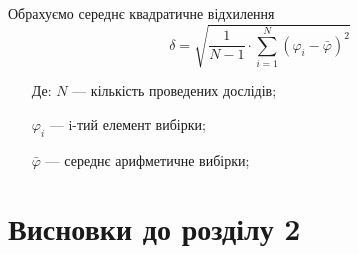 Обрахуємо середнє квадратичне відхилення
\begin{equation}
  \delta = \sqrt{\frac{1}{N-1} \cdot \displaystyle\sum_{i=1}^{N} ({\varphi_i} -\bar{\varphi})^2}
\end{equation}
\begin{itemize}
\item [Де:] $N$ --- кількість проведених дослідів;
\item []$\varphi_i$ ---  i-тий елемент вибірки;
\item []$\bar{\varphi}$ ---  середнє арифметичне вибірки;
\end{itemize}



\section*{Висновки до розділу 2}
